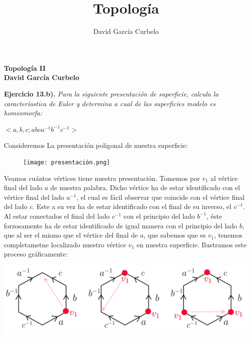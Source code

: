 \documentclass[fleqn]{article}
\author{David García Curbelo}
\title{Topología}
\begin{document}
    \setcounter{page}{1}
    \pagestyle{plain}

    \begin{center}
        {\large\bf{Topología II}} \\
        \bf{David García Curbelo}\\
        
    \end{center}

    \textbf{Ejercicio 13.b). } \textit{Para la siguiente presentación de superficie, calcula la caracteríastica de Euler y determina a 
                    cual de las superficies modelo es homeomorfa:}
                    
                    \begin{center}
                        {\Large{$<a,b,c; abca^{-1}b^{-1}c^{-1}>$}}
                    \end{center}


    Consideremos La presentación poligonal de nuestra superficie:
    \begin{figure}
        \centering
        \texttt{[image: presentación.png]}
    \end{figure}

    
    Veamos cuántos vértices tiene nuestra presentación. Tomemos por $v_1$ al vértice final del lado $a$ de nuestra palabra. Dicho vértice ha de estar
    identificado con el vértice final del lado $a^{-1}$, el cual es fácil observar que coincide con el vértice final del lado $c$. Este a su vez 
    ha de estar identificado con el final de su inverso, el $c^{-1}$. Al estar conectados el final del lado $c^{-1}$ con el principio del lado $b^{-1}$,
    éste forzosamente ha de estar identificado de igual manera con el principio del lado $b$, que al ser el mismo que el vértice del final de $a$, 
    que sabemos que es $v_1$, tenemos completametne localizado nuestro vértice $v_1$ en nuestra superficie. Ilustramos este proceso gráficamente:

    \begin{center}
        \noindent
        \includegraphics[width=1\linewidth]{v1.png}    
    \end{center}
\end{document}
